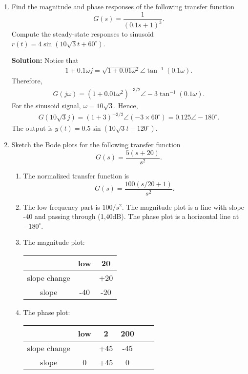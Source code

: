 \documentclass{article}
\newcommand{\tikzdir}[1]{tikz/#1.tikz}
\newcommand{\inputtikz}[1]{}}
\begin{document}
\begin{enumerate}
\begin{figure}[h]
  \centering
  \inputtikz{Quiz12}
\end{figure}
\newpage  
\item Find the magnitude and phase responses of the following transfer function
  \[
    G(s) = \frac{1}{(0.1s+1)^3}.
  \]
  Compute the steady-state responses to sinusoid $r(t) = 4\sin(10\sqrt{3}t+60^\circ)$.

  {\bf Solution:} Notice that 
  \begin{align*}
    1+0.1\omega j = \sqrt{1+0.01\omega^2} \angle \tan^{-1}(0.1\omega).
  \end{align*}
  Therefore,
  \begin{align*}
    G(j\omega) = \left(1+0.01\omega^2\right)^{-3/2}\angle -3\tan^{-1}(0.1\omega).
  \end{align*}
  For the sinusoid signal, $\omega = 10\sqrt{3}$. Hence,
  \begin{align*}
    G(10\sqrt{3}j) = \left(1+3\right)^{-3/2}\angle (-3\times 60^\circ) = 0.125\angle -180^\circ.
  \end{align*}
  The output is $y(t) = 0.5 \sin(10\sqrt{3}t -120^\circ)$.
  \newpage

\item Sketch the Bode plots for the following transfer function
  \[
    G(s) = \frac{5(s+20)}{s^2}.
  \]
 \begin{enumerate}
  \item The normalized transfer function is
  \[
    G(s) = \frac{100(s/20+1)}{s^2}.
  \]
    
\item The low frequency part is $100/s^2$. The magnitude plot is a line with slope -40 and passing through (1,40dB). The phase plot is a horizontal line at $-180^\circ$.
\item The magnitude plot:
  \begin{table}[h]
    \centering
    \begin{tabular}{c|cc}
      & low &  20  \\
      \hline
      slope change &     &  +20 \\
      slope        & -40 &  -20
    \end{tabular}
  \end{table}
\item The phase plot:
  \begin{table}[h]
    \centering
    \begin{tabular}{c|ccccc}
      & low &   2   &  200 \\
      \hline
      slope change &     &  +45 & -45 \\
      slope        & 0   &  +45 & 0  
    \end{tabular}
  \end{table}
\end{enumerate}
\begin{figure}[h]
  \centering
  \inputtikz{Quiz14}
\end{figure}
\end{enumerate}
\end{document}
